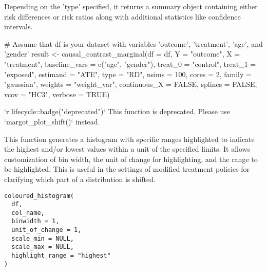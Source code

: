 \documentclass[a4paper]{book}
\begin{document}
%
\begin{Value}
Depending on the 'type' specified, it returns a summary object containing either risk differences or risk ratios along with additional statistics like confidence intervals.
\end{Value}
%
\begin{Examples}
\begin{ExampleCode}
# Assume that df is your dataset with variables 'outcome', 'treatment', 'age', and 'gender'
result <- causal_contrast_marginal(df = df, Y = "outcome", X = "treatment",
                                   baseline_vars = c("age", "gender"),
                                   treat_0 = "control", treat_1 = "exposed",
                                   estimand = "ATE", type = "RD", nsims = 100,
                                   cores = 2, family = "gaussian", weights = "weight_var",
                                   continuous_X = FALSE, splines = FALSE,
                                   vcov = "HC3", verbose = TRUE)

\end{ExampleCode}
\end{Examples}
%
\begin{Description}
`r lifecycle::badge("deprecated")`
This function is deprecated. Please use `margot\_plot\_shift()` instead.

This function generates a histogram with specific ranges highlighted to indicate
the highest and/or lowest values within a unit of the specified limits. It allows
customization of bin width, the unit of change for highlighting, and the range to be highlighted. This is useful in the settings of modified treatment policies for
clarifying which part of a distribution is shifted.
\end{Description}
%
\begin{Usage}
\begin{verbatim}
coloured_histogram(
  df,
  col_name,
  binwidth = 1,
  unit_of_change = 1,
  scale_min = NULL,
  scale_max = NULL,
  highlight_range = "highest"
)
\end{verbatim}
\end{Usage}
%
\end{document}
